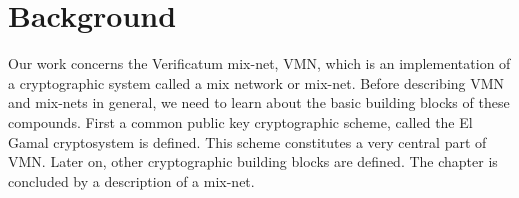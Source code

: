 \section{Background}

Our work concerns the Verificatum mix-net, VMN, which is an
implementation of a cryptographic system called a mix network or
mix-net. Before describing VMN and mix-nets in general, we need to
learn about the basic building blocks of these compounds. First a
common public key cryptographic scheme, called the El Gamal
cryptosystem is defined. This scheme constitutes a very central part
of VMN. Later on, other cryptographic building blocks are defined. The
chapter is concluded by a description of a mix-net.




